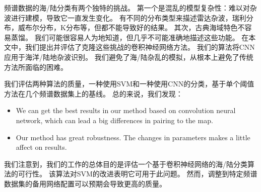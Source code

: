 频谱数据的海/陆分类有两个独特的挑战。 第一个是混乱的模型复杂性：难以对杂波进行建模，导致它一直发生变化。 有不同的分布类型来描述雷达杂波，瑞利分布，威布尔分布，K分布等，但都不能导致好的结果。 其次，古典海域特色不容易蒸馏。 我们可能很容易人为地知道，但几乎不可能准确地描述这些功能。 在本文中，我们提出并评估了克隆这些挑战的卷积神经网络方法。 我们的算法将CNN应用于海洋/陆地杂波识别。 我们避免了海/陆杂乱的模拟，从根本上避免了传统方法所面临的困难。


我们评估两种算法的质量，一种使用SVM和一种使用CNN的分类，基于单个阈值方法在几个频谱数据集上的基线。 总的来说，我们发现：

\begin{itemize}
	\item We can get the best results in our method based on convolution neural network, which can lead a big differences in pairing to the map.
	\item Our method has great robustness. The changes in parameters makes a little affect on results.
\end{itemize}

我们注意到，我们的工作的总体目的是评估一个基于卷积神经网络的海/陆分类算法的可行性。 该算法对SVM的改进表明它可用于此问题。 然而，调整到特定频谱数据集的备用网络配置可以预期会导致更高的质量。

